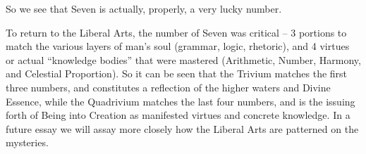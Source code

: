 So we see that Seven is actually, properly, a very lucky number.

To return to the Liberal Arts, the number of Seven was critical -- 3 portions to match the various layers of man's soul (grammar, logic, rhetoric), and 4 virtues or actual ``knowledge bodies'' that were mastered (Arithmetic, Number, Harmony, and Celestial Proportion). So it can be seen that the Trivium matches the first three numbers, and constitutes a reflection of the higher waters and Divine Essence, while the Quadrivium matches the last four numbers, and is the issuing forth of Being into Creation as manifested virtues and concrete knowledge. In a future essay we will assay more closely how the Liberal Arts are patterned on the mysteries.



